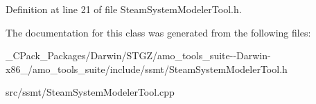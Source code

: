 Definition at line 21 of file Steam\+System\+Modeler\+Tool.\+h.



The documentation for this class was generated from the following files\+:\begin{DoxyCompactItemize}
\item 
\+\_\+\+C\+Pack\+\_\+\+Packages/\+Darwin/\+S\+T\+G\+Z/amo\+\_\+tools\+\_\+suite-\/-\/\+Darwin-\/x86\+\_/amo\+\_\+tools\+\_\+suite/include/ssmt/Steam\+System\+Modeler\+Tool.\+h\item 
src/ssmt/Steam\+System\+Modeler\+Tool.\+cpp\end{DoxyCompactItemize}
